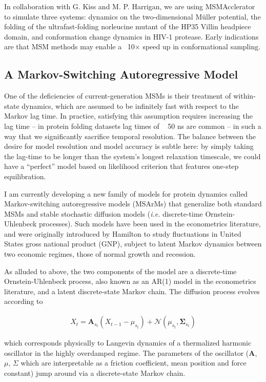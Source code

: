 \documentclass[twocolumn,floatfix,nofootinbib,aps]{revtex4-1}
\begin{document}
In collaboration with G. Kiss and M. P. Harrigan, we are using MSMAcclerator to simulate three systems: dynamics on the two-dimensional M\"{u}ller potential, the folding of the ultrafast-folding norleucine mutant of the HP35 Villin headpiece domain\cite{Kubelka2006Sub}, and conformation change dynamics in HIV-1 protease. Early indications are that MSM methods may enable a ~10$\times$ speed up in conformational sampling.

\subsection{A Markov-Switching Autoregressive Model}

One of the deficiencies of current-generation MSMs is their treatment of within-state dynamics, which are assumed to be infinitely fast with respect to the Markov lag time. In practice, satisfying this assumption requires increasing the lag time -- in protein folding datasets lag times of ~ 50 ns are common -- in such a way that we significantly sacrifice temporal resolution. The balance between the desire for model resolution and model accuracy is subtle here: by simply taking the lag-time to be longer than the system's longest relaxation timescale, we could have a ``perfect'' model based on likelihood criterion that features one-step equilibration.

I am currently developing a new family of models for protein dynamics called Markov-switching autoregressive models (MSArMs) that generalize both standard MSMs and stable stochastic diffusion models (\emph{i.e.} discrete-time Ornstein-Uhlenbeck processes). Such models have been used in the econometrics literature, and were originally introduced by Hamilton\cite{Hamilton1989New, Hamilton1990Analysis} to study fluctuations in United States gross national product (GNP), subject to latent Markov dynamics between two economic regimes, those of normal growth and recession.

As alluded to above, the two components of the model are a discrete-time Ornstein-Uhlenbeck process, also known as an AR(1) model in the econometrics literature, and a latent discrete-state Markov chain. The diffusion process evolves according to

\begin{align}
X_t = \mathbf{A}_{s_t} (X_{t-1} - \mu_{s_t}) + \mathcal{N}(\mu_{s_t}, \mathbf{\Sigma}_{s_t})
\end{align}

which corresponds physically to Langevin dynamics of a thermalized harmonic oscillator in the highly overdamped regime. The parameters of the oscillator ($\mathbf{A}$, $\mu$, $\Sigma$ which are interpretable as a friction coefficient, mean position and force constant) jump around via a discrete-state Markov chain.
\end{document}
